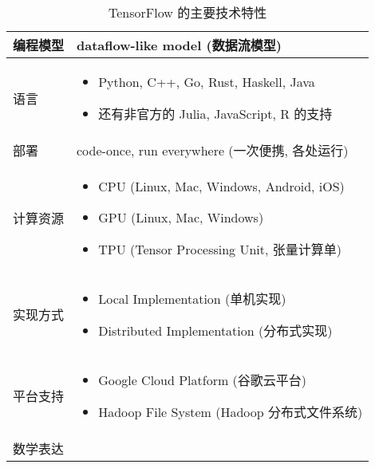 \begin{table}[!htb]
	\centering
	\caption{TensorFlow 的主要技术特性}
	\label{tab:technical characteristics of tensorflow}
	\begin{tabu}{X[l, -1]|X[l]}
		\tabucline[1pt]{-}
		编程模型 & dataflow-like model (数据流模型)\\\hline
		语言     & 
		\begin{minipage}[t]{\linewidth}	
			\begin{itemize}
				\item Python, C++, Go, Rust, Haskell, Java
				\item 还有非官方的 Julia, JavaScript, R 的支持
			\end{itemize}
		\end{minipage}\\\hline
		部署     & code-once, run everywhere (一次便携, 各处运行)\\\hline
		计算资源 &
		\begin{minipage}[t]{\linewidth}
			\begin{itemize}
				\item CPU (Linux, Mac, Windows, Android, iOS)
				\item GPU (Linux, Mac, Windows)
				\item TPU (Tensor Processing Unit, 张量计算单)
			\end{itemize}
		\end{minipage}\\\hline
		实现方式 &
		\begin{minipage}[t]{\linewidth}
			\begin{itemize}
				\item Local Implementation (单机实现)
				\item Distributed Implementation (分布式实现)
			\end{itemize}
		\end{minipage}\\\hline
		平台支持 &
		\begin{minipage}[t]{\linewidth}
			\begin{itemize}
				\item Google Cloud Platform (谷歌云平台)
				\item Hadoop File System (Hadoop 分布式文件系统)
			\end{itemize}
		\end{minipage}\\\hline
		数学表达 &
		\begin{minipage}[t]{\linewidth}
			\begin{itemize}

\end{itemize}
\end{minipage}
\end{tabu}
\end{table}
